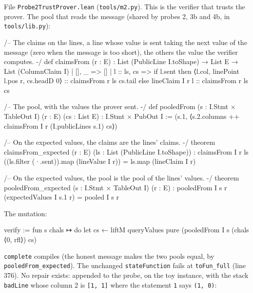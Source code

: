 File \texttt{Probe2TrustProver.\allowbreak{}lean} (\texttt{tools/\allowbreak{}m2.\allowbreak{}py}). This is the verifier that trusts the prover. The pool that reads the message (shared by probes 2, 3b and 4b, in \texttt{tools/\allowbreak{}lib.\allowbreak{}py}):

\begin{leancode}
/-- The claims on the lines, a line whose value is sent taking the next value of the message
(zero when the message is too short), the others the value the verifier computes. -/
def claimsFrom (r : E) : List (PublicLine I.toShape) → List E → List (ColumnClaim I)
  | [], _ => []
  | l :: ls, cs =>
    if l.sent then ⟨l.col, linePoint l.pos r, cs.headD 0⟩ :: claimsFrom r ls cs.tail
    else lineClaim I r l :: claimsFrom r ls cs

/-- The pool, with the values the prover sent. -/
def pooledFrom (s : I.Stmt × TableOut I) (r : E) (cs : List E) : I.Stmt × PubOut I :=
  (s.1, ⟨s.2.columns ++ claimsFrom I r (I.publicLines s.1) cs⟩)

/-- On the expected values, the claims are the lines' claims. -/
theorem claimsFrom_expected (r : E) (ls : List (PublicLine I.toShape)) :
    claimsFrom I r ls ((ls.filter (·.sent)).map (lineValue I r)) = ls.map (lineClaim I r)

/-- On the expected values, the pool is the pool of the lines' values. -/
theorem pooledFrom_expected (s : I.Stmt × TableOut I) (r : E) :
    pooledFrom I s r (expectedValues I s.1 r) = pooled I s r
\end{leancode}

The mutation:

\begin{leancode}
  verify := fun s chals ↦ do
    let cs ← liftM queryValues
    pure (pooledFrom I s (chals ⟨0, rfl⟩) cs)
\end{leancode}

\texttt{complete} compiles (the honest message makes the two pools equal, by \texttt{pooledFrom\_\allowbreak{}expected}). The unchanged \texttt{stateFunction} fails at \texttt{toFun\_\allowbreak{}full} (line 376). No repair exists: appended to the probe, on the toy instance, with the stack \texttt{badLine} whose column 2 is \texttt{[1,\allowbreak{} 1]} where the statement \texttt{1} says \texttt{(\allowbreak{}1,\allowbreak{} 0)}:

